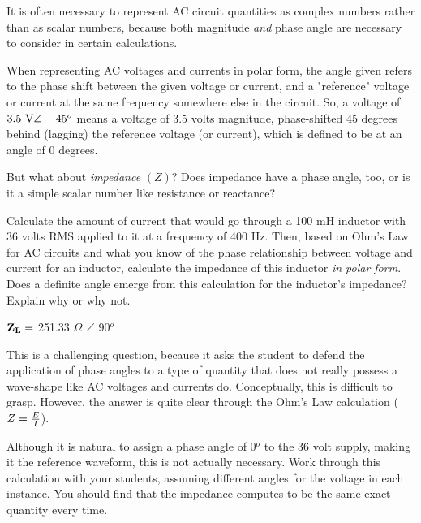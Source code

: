 

It is often necessary to represent AC circuit quantities as complex numbers rather than as scalar numbers, because both magnitude {\it and} phase angle are necessary to consider in certain calculations.

When representing AC voltages and currents in polar form, the angle given refers to the phase shift between the given voltage or current, and a "reference" voltage or current at the same frequency somewhere else in the circuit.  So, a voltage of $3.5 \hbox{ V} \angle -45^o$ means a voltage of 3.5 volts magnitude, phase-shifted 45 degrees behind (lagging) the reference voltage (or current), which is defined to be at an angle of 0 degrees.

But what about {\it impedance} $(Z)$?  Does impedance have a phase angle, too, or is it a simple scalar number like resistance or reactance?  

\vskip 10pt

Calculate the amount of current that would go through a 100 mH inductor with 36 volts RMS applied to it at a frequency of 400 Hz.  Then, based on Ohm's Law for AC circuits and what you know of the phase relationship between voltage and current for an inductor, calculate the impedance of this inductor {\it in polar form}.  Does a definite angle emerge from this calculation for the inductor's impedance?  Explain why or why not.







${\bf Z_L} =$ 251.33 $\Omega$ $\angle$ 90$^{o}$







This is a challenging question, because it asks the student to defend the application of phase angles to a type of quantity that does not really possess a wave-shape like AC voltages and currents do.  Conceptually, this is difficult to grasp.  However, the answer is quite clear through the Ohm's Law calculation ($Z = {E \over I}$).

Although it is natural to assign a phase angle of 0$^{o}$ to the 36 volt supply, making it the reference waveform, this is not actually necessary.  Work through this calculation with your students, assuming different angles for the voltage in each instance.  You should find that the impedance computes to be the same exact quantity every time.





